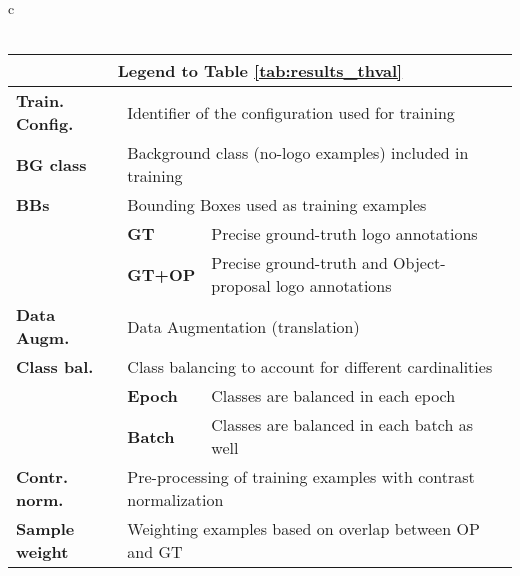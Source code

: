 \documentclass[final,5p,twocolumn]{elsarticle}
\begin{document}
\begin{table*}[!hhtbp]
\begin{tabular}{c}
\\
\\

\footnotesize
\centering
\begin{tabular}{@{}lll@{}}
\toprule
\multicolumn{3}{c}{\textbf{Legend to Table \ref{tab:results_thval}}}                                                                       \\ \midrule
\textbf{Train. Config.}   & \multicolumn{2}{l}{Identifier of the configuration used for training} \\
\textbf{BG class}   & \multicolumn{2}{l}{Background class (no-logo examples) included in training}        \\
\textbf{BBs}        & \multicolumn{2}{l}{Bounding Boxes used as training examples}                        \\
                    & \textbf{GT}                 & Precise ground-truth logo annotations                                     \\
                    & \textbf{GT+OP}              & Precise ground-truth and Object-proposal logo annotations           \\
\textbf{Data Augm.} & \multicolumn{2}{l}{Data Augmentation (translation)}                                 \\
\textbf{Class bal.} & \multicolumn{2}{l}{Class balancing to account for different cardinalities}         \\
                    & \textbf{Epoch}            & Classes are balanced in each epoch                    \\
                    & \textbf{Batch}            & Classes are balanced in each batch as well            \\
\textbf{Contr. norm.}  & \multicolumn{2}{l}{Pre-processing of training examples with contrast normalization} \\
\textbf{Sample weight}     & \multicolumn{2}{l}{Weighting examples based on overlap between OP and GT}           \\ \bottomrule
\end{tabular}


\end{tabular}
\end{table*}
\end{document}
